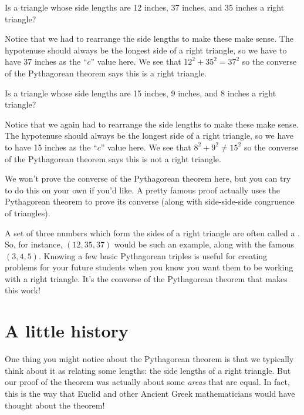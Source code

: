 \documentclass{ximera}
\begin{document}
\begin{question}
Is a triangle whose side lengths are 12 inches, 37 inches, and 35 inches a right triangle?
\begin{multipleChoice}
\end{multipleChoice}
\begin{feedback}[correct] Notice that we had to rearrange the side lengths to make these make sense. The hypotenuse should always be the longest side of a right triangle, so we have to have 37 inches as the ``$c$'' value here. We see that $12^2 + 35^2 = 37^2$ so the converse of the Pythagorean theorem says this is a right triangle.
\end{feedback}
\end{question}

\begin{question}
Is a triangle whose side lengths are 15 inches, 9 inches, and 8 inches a right triangle?
\begin{multipleChoice}
\end{multipleChoice}
\begin{feedback}[correct] Notice that we again had to rearrange the side lengths to make these make sense. The hypotenuse should always be the longest side of a right triangle, so we have to have 15 inches as the ``$c$'' value here. We see that $8^2 + 9^2 \neq 15^2$ so the converse of the Pythagorean theorem says this is not a right triangle.
\end{feedback}
\end{question}
We won't prove the converse of the Pythagorean theorem here, but you can try to do this on your own if you'd like. A pretty famous proof actually uses the Pythagorean theorem to prove its converse (along with side-side-side congruence of triangles).

A set of three numbers which form the sides of a right triangle are often called a . So, for instance, $(12, 35, 37)$ would be such an example, along with the famous $(3, 4, 5)$. Knowing a few basic Pythagorean triples is useful for creating problems for your future students when you know you want them to be working with a right triangle. It's the converse of the Pythagorean theorem that makes this work!


\section{A little history}
One thing you might notice about the Pythagorean theorem is that we typically think about it as relating some lengths: the side lengths of a right triangle. But our proof of the theorem was actually about some \emph{areas} that are equal. In fact, this is the way that Euclid and other Ancient Greek mathematicians would have thought about the theorem!
\end{document}

